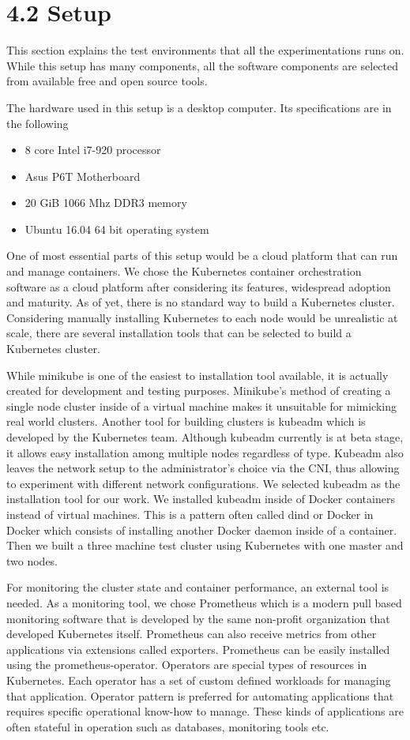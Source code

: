 \documentclass[12pt,oneandhalf,chaparabic,ceng,ms,eng,oneside,pntc]{gsufbe}
\begin{document}
\section[Setup]{4.2 Setup}
This section explains the test environments that all the experimentations runs on.  While this
setup has many components, all the software components are selected from available free and open source
tools.

The hardware used in this setup is a desktop computer.  Its specifications are in the following
\begin{itemize}
 \item 8 core Intel i7-920 processor
 \item Asus P6T Motherboard
 \item 20 GiB 1066 Mhz DDR3 memory
 \item Ubuntu 16.04 64 bit operating system
\end{itemize}

One of most essential parts of this setup would be a cloud platform that can run and manage containers.
We chose the Kubernetes container orchestration software as a cloud platform after considering its
features, widespread adoption and maturity.  As of yet, there is no standard way to build a Kubernetes
cluster.  Considering manually installing Kubernetes to each node would be unrealistic at scale, there
are several installation tools that can be selected to build a Kubernetes cluster.

While minikube is one of the easiest to installation tool available, it is actually created for 
development and testing purposes.  Minikube's method of creating a single node
cluster inside of a virtual machine makes it unsuitable for mimicking real world clusters.  Another
tool for building clusters is kubeadm which is developed by the Kubernetes team.  Although kubeadm currently
is at beta stage, it allows easy installation among multiple nodes regardless of type. Kubeadm also leaves the
network setup to the administrator's choice via the CNI, thus allowing to experiment with different
network configurations. We selected kubeadm as the 
installation tool for our work.  We installed kubeadm inside of Docker containers instead of virtual
machines.  This is a pattern often called dind or Docker in Docker which consists of installing
another Docker daemon inside of a container. Then we built a three machine test cluster using Kubernetes with one
master and two nodes.

For monitoring the cluster state and container performance, an external tool is needed.  As a monitoring
tool, we chose Prometheus which is a modern pull based monitoring software that is developed by the same
non-profit 
organization that developed Kubernetes itself. Prometheus can also receive metrics from other applications
via extensions called exporters. Prometheus can be easily installed using the prometheus-operator.
Operators are special types of resources in Kubernetes.  Each operator has a set of custom defined
workloads for managing that application. Operator pattern is preferred for automating applications that
requires specific operational know-how to manage.  These kinds of applications are often stateful in
operation such as databases, monitoring tools etc.
\end{document}
